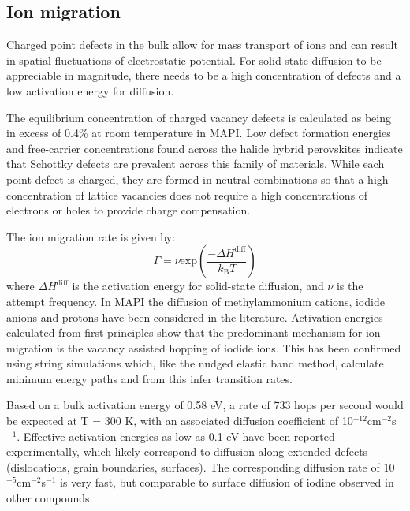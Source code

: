 \subsection{Ion migration} 

Charged point defects in the bulk allow for mass transport of ions and can result in spatial fluctuations of electrostatic potential.
For solid-state diffusion to be appreciable in magnitude, there needs to be a high concentration of defects and a low activation energy for diffusion. 

The equilibrium concentration of charged vacancy defects is calculated as being in excess of 0.4\% at room temperature in MAPI.\autocite{Walsh2015}
Low defect formation energies and free-carrier concentrations found across the halide hybrid perovskites indicate that Schottky defects are prevalent across this family of materials.
While each point defect is charged, they are formed in neutral combinations so that a high concentration of lattice vacancies does not require a high concentrations of electrons or holes to provide charge compensation. 

The ion migration rate is given by:
%
\begin{equation}
\Gamma = \nu \textrm{exp} \left( \frac{-\Delta H^\textrm{diff}}{k_\mathrm{B}T} \right)
\end{equation}
%
where $\Delta H^\textrm{diff}$ is the activation energy for solid-state diffusion,
and $\nu$ is the attempt frequency. 
In MAPI the diffusion of methylammonium cations, iodide anions and protons have been considered in the literature. 
Activation energies calculated from first principles show that the predominant mechanism for ion migration is the vacancy assisted hopping of iodide ions.\autocite{Eames2015a}
This has been confirmed using string simulations\autocite{Meloni2016a} which, like the nudged elastic band method, calculate minimum energy paths and from this infer transition rates.

Based on a bulk activation energy of 0.58 eV\autocite{Eames2015a}, a rate of 733 hops per second would be expected at T = 300 K, with an associated diffusion coefficient of 10$^{-12}$cm$^{-2}$s$^{-1}$.
Effective activation energies as low as 0.1 eV have been reported experimentally,\autocite{Bryant2015,Game2017} which likely 
correspond to diffusion along extended defects (dislocations, grain boundaries, surfaces)\autocite{Shao2016a,Yun2016}.
The corresponding diffusion rate of 10$^{-5}$cm$^{-2}$s$^{-1}$ is very fast, but comparable to surface 
diffusion of iodine observed in other compounds.\autocite{Chandra1980}


